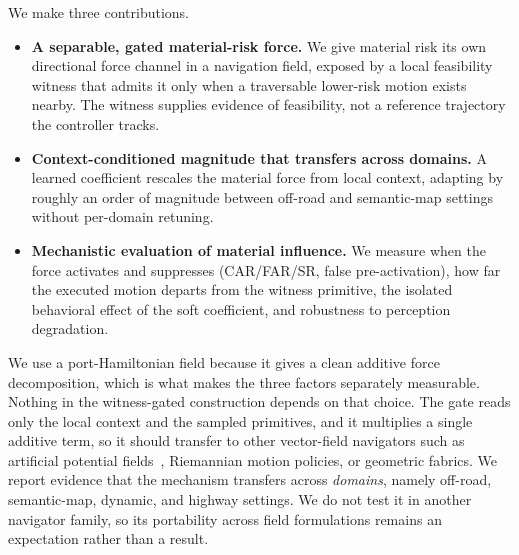We make three contributions.
\begin{itemize}
  \item \textbf{A separable, gated material-risk force.} We give material risk its own directional force channel in a navigation field, exposed by a local feasibility witness that admits it only when a traversable lower-risk motion exists nearby. The witness supplies evidence of feasibility, not a reference trajectory the controller tracks.
  \item \textbf{Context-conditioned magnitude that transfers across domains.} A learned coefficient rescales the material force from local context, adapting by roughly an order of magnitude between off-road and semantic-map settings without per-domain retuning.
  \item \textbf{Mechanistic evaluation of material influence.} We measure when the force activates and suppresses (CAR/FAR/SR, false pre-activation), how far the executed motion departs from the witness primitive, the isolated behavioral effect of the soft coefficient, and robustness to perception degradation.
\end{itemize}

We use a port-Hamiltonian field because it gives a clean additive force decomposition, which is what makes the three factors separately measurable. Nothing in the witness-gated construction depends on that choice. The gate reads only the local context and the sampled primitives, and it multiplies a single additive term, so it should transfer to other vector-field navigators such as artificial potential fields~\citep{khatib1986real}, Riemannian motion policies, or geometric fabrics. We report evidence that the mechanism transfers across \emph{domains}, namely off-road, semantic-map, dynamic, and highway settings. We do not test it in another navigator family, so its portability across field formulations remains an expectation rather than a result.